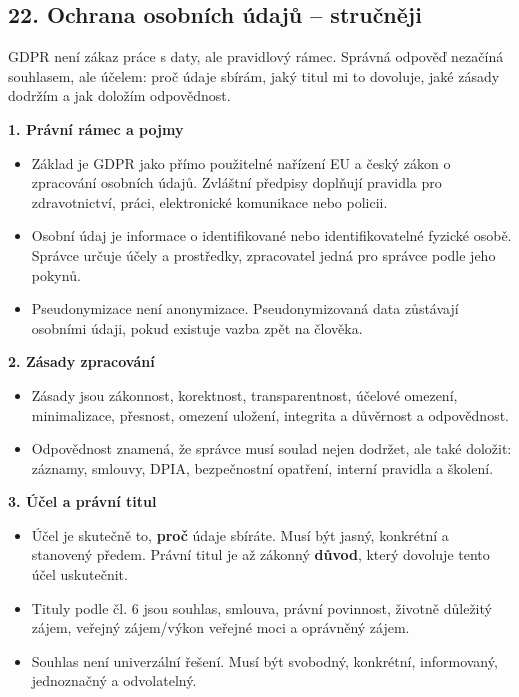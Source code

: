
\subsection*{22. Ochrana osobních údajů -- stručněji}
GDPR není zákaz práce s daty, ale pravidlový rámec. Správná odpověď nezačíná souhlasem, ale účelem: proč údaje sbírám, jaký titul mi to dovoluje, jaké zásady dodržím a jak doložím odpovědnost.

\textbf{1. Právní rámec a pojmy}
\begin{itemize}
  \item Základ je GDPR jako přímo použitelné nařízení EU a český zákon o zpracování osobních údajů. Zvláštní předpisy doplňují pravidla pro zdravotnictví, práci, elektronické komunikace nebo policii.
  \item Osobní údaj je informace o identifikované nebo identifikovatelné fyzické osobě. Správce určuje účely a prostředky, zpracovatel jedná pro správce podle jeho pokynů.
  \item Pseudonymizace není anonymizace. Pseudonymizovaná data zůstávají osobními údaji, pokud existuje vazba zpět na člověka.
\end{itemize}

\textbf{2. Zásady zpracování}
\begin{itemize}
  \item Zásady jsou zákonnost, korektnost, transparentnost, účelové omezení, minimalizace, přesnost, omezení uložení, integrita a důvěrnost a odpovědnost.
  \item Odpovědnost znamená, že správce musí soulad nejen dodržet, ale také doložit: záznamy, smlouvy, DPIA, bezpečnostní opatření, interní pravidla a školení.
\end{itemize}

\textbf{3. Účel a právní titul}
\begin{itemize}
  \item Účel je skutečně to, \textbf{proč} údaje sbíráte. Musí být jasný, konkrétní a stanovený předem. Právní titul je až zákonný \textbf{důvod}, který dovoluje tento účel uskutečnit.
  \item Tituly podle čl. 6 jsou souhlas, smlouva, právní povinnost, životně důležitý zájem, veřejný zájem/výkon veřejné moci a oprávněný zájem.
  \item Souhlas není univerzální řešení. Musí být svobodný, konkrétní, informovaný, jednoznačný a odvolatelný.
\end{itemize}

